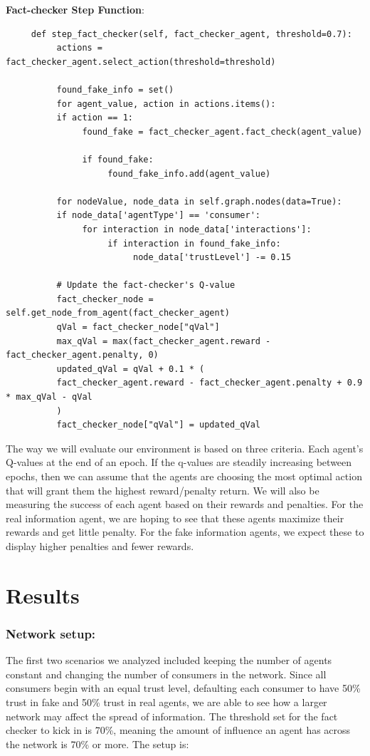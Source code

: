 \documentclass[twoside]{article}
\begin{document}
\textbf{Fact-checker Step Function}:

\begin{verbatim}
     def step_fact_checker(self, fact_checker_agent, threshold=0.7):
          actions = fact_checker_agent.select_action(threshold=threshold)

          found_fake_info = set()
          for agent_value, action in actions.items():
          if action == 1:
               found_fake = fact_checker_agent.fact_check(agent_value)
               
               if found_fake:
                    found_fake_info.add(agent_value)
          
          for nodeValue, node_data in self.graph.nodes(data=True):
          if node_data['agentType'] == 'consumer':
               for interaction in node_data['interactions']:
                    if interaction in found_fake_info:
                         node_data['trustLevel'] -= 0.15

          # Update the fact-checker's Q-value
          fact_checker_node = self.get_node_from_agent(fact_checker_agent)
          qVal = fact_checker_node["qVal"]
          max_qVal = max(fact_checker_agent.reward - fact_checker_agent.penalty, 0)
          updated_qVal = qVal + 0.1 * (
          fact_checker_agent.reward - fact_checker_agent.penalty + 0.9 * max_qVal - qVal
          )
          fact_checker_node["qVal"] = updated_qVal
\end{verbatim}

The way we will evaluate our environment is based on three criteria. Each agent's Q-values at the end of an epoch. If the q-values are steadily increasing between epochs, then we can assume that the agents are choosing the most optimal action that will grant them the highest reward/penalty return. We will also be measuring the success of each agent based on their rewards and penalties. For the real information agent, we are hoping to see that these agents maximize their rewards and get little penalty. For the fake information agents, we expect these to display higher penalties and fewer rewards.

\section{Results}
\subsubsection{Network setup: }
The first two scenarios we analyzed included keeping the number of agents constant and changing the number of consumers in the network. Since all consumers begin with an equal trust level, defaulting each consumer to have 50\% trust in fake and 50\% trust in real agents, we are able to see how a larger network may affect the spread of information. The threshold set for the fact checker to kick in is 70\%, meaning the amount of influence an agent has across the network is 70\% or more. The setup is:
\end{document}
